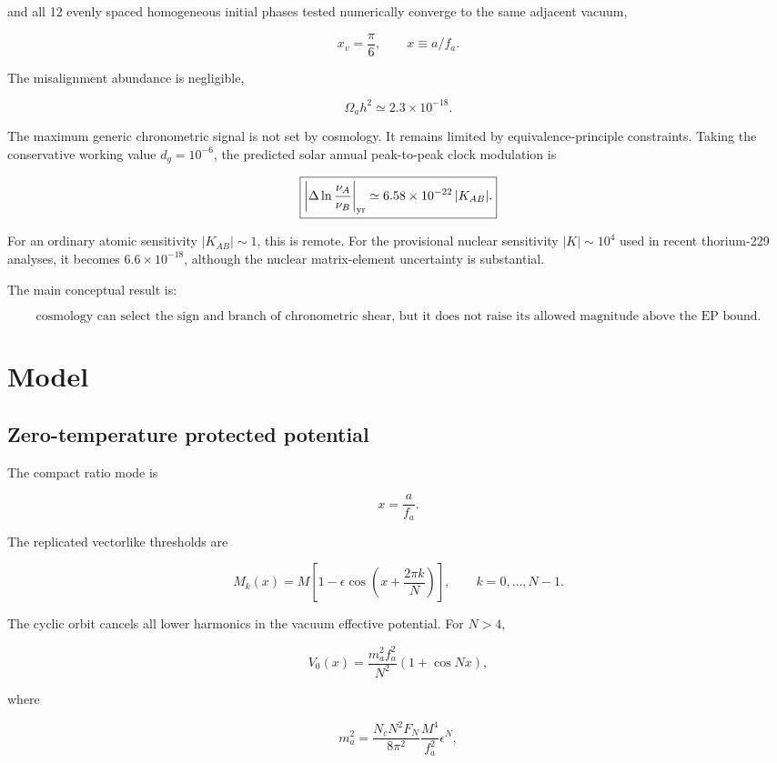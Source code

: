 \documentclass[
  10pt,
]{article}
\begin{document}
and all 12 evenly spaced homogeneous initial phases tested numerically
converge to the same adjacent vacuum,

\[
\boxed{x_v=\frac{\pi}{6}},\qquad x\equiv a/f_a.
\]

The misalignment abundance is negligible,

\[
\Omega_a h^2\simeq2.3\times10^{-18}.
\]

The maximum generic chronometric signal is not set by cosmology. It
remains limited by equivalence-principle constraints. Taking the
conservative working value \(d_g=10^{-6}\), the predicted solar annual
peak-to-peak clock modulation is

\[
\boxed{
\left|\Delta\ln\frac{\nu_A}{\nu_B}\right|_{\rm yr}
\simeq 6.58\times10^{-22}\,|K_{AB}|.
}
\]

For an ordinary atomic sensitivity \(|K_{AB}|\sim1\), this is remote.
For the provisional nuclear sensitivity \(|K|\sim10^4\) used in recent
thorium-229 analyses, it becomes \(6.6\times10^{-18}\), although the
nuclear matrix-element uncertainty is substantial.

The main conceptual result is:

\[
\boxed{
\text{cosmology can select the sign and branch of chronometric shear,}
\text{ but it does not raise its allowed magnitude above the EP bound.}
}
\]

\section{Model}\label{model}

\subsection{Zero-temperature protected
potential}\label{zero-temperature-protected-potential}

The compact ratio mode is

\[
x=\frac{a}{f_a}.
\]

The replicated vectorlike thresholds are

\[
M_k(x)=M\left[1-\epsilon\cos\left(x+\frac{2\pi k}{N}\right)\right],
\qquad k=0,\ldots,N-1.
\]

The cyclic orbit cancels all lower harmonics in the vacuum effective
potential. For \(N>4\),

\[
V_0(x)=\frac{m_a^2f_a^2}{N^2}\left(1+\cos Nx\right),
\]

where

\[
m_a^2=
\frac{N_cN^2F_N}{8\pi^2}
\frac{M^4}{f_a^2}\epsilon^N,
\]
\end{document}
